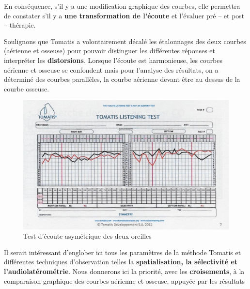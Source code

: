  En  conséquence,  s'il y a une modification
          graphique des courbes, elle
          permettra de constater s'il y a \textbf{une transformation de l'écoute}
          et l'évaluer pré -- et
          post -- thérapie.




Soulignons que Tomatis a volontairement décalé les étalonnages des deux courbes (aérienne et osseuse) pour pouvoir distinguer les différentes réponses et interpréter
	les \textbf{distorsions}. Lorsque l'écoute est harmonieuse, les
	courbes aérienne et osseuse se confondent mais pour l'analyse des
	résultats, on a déterminé des courbes parallèles, la courbe aérienne
	devant être au dessus de la courbe osseuse.


\begin{figure}
	\centering
	\includegraphics[width=1\linewidth]{images/tomatisListeningTest.jpg}
	\caption[Test d'écoute]{Test
          d'écoute asymétrique des deux oreilles}
	\label{Test d'écoute asymétrique avec oreille droite et oreille gauche}
\end{figure}
 Il serait intéressant d'englober ici tous les paramètres de la méthode Tomatis et différentes techniques 
 d'observation telles la \textbf{spatialisation, la sélectivité et l'audiolatérométrie}. 
Nous
donnerons ici la priorité, avec les  \textbf{croisements}, à la comparaison graphique
des courbes aérienne et osseuse, appuyée  par les résultats
